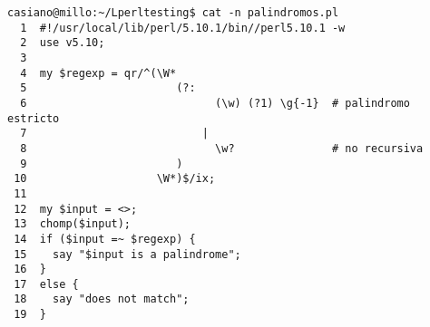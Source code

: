 \begin{latexonly}
\begin{verbatim}
casiano@millo:~/Lperltesting$ cat -n palindromos.pl
  1  #!/usr/local/lib/perl/5.10.1/bin//perl5.10.1 -w
  2  use v5.10;
  3
  4  my $regexp = qr/^(\W*
  5                       (?:
  6                             (\w) (?1) \g{-1}  # palindromo estricto
  7                           |
  8                             \w?               # no recursiva
  9                       )
 10                    \W*)$/ix;
 11
 12  my $input = <>;
 13  chomp($input);
 14  if ($input =~ $regexp) {
 15    say "$input is a palindrome";
 16  }
 17  else {
 18    say "does not match";
 19  }
\end{verbatim}
\end{latexonly}
\begin{verbatim}


\end{verbatim}

